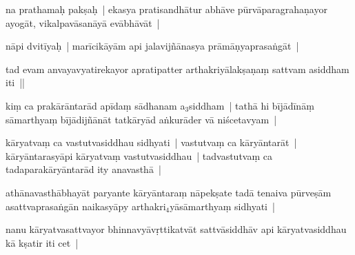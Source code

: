 \documentclass[article,12pt,a4paper]{memoir}%
\newcounter{parCount}
\begin{document}
	  
	  \pstart \leavevmode%
	\label{thakur75-71.7}na prathamaḥ pakṣaḥ | ekasya pratisandhātur abhāve pūrvāparagrahaṇayor ayogāt, vikalpavāsanāyā evābhāvāt |
	{}
	\pend%
      

	  
	  \pstart \leavevmode%
	\label{thakur75-71.9}nāpi dvitīyaḥ | marīcikāyām api jalavijñānasya prāmāṇyaprasaṅgāt |
	{}
	\pend%
      

	  
	  \pstart \leavevmode%
	\label{thakur75-71.9a}tad evam anvayavyatirekayor apratipatter arthakriyālakṣaṇaṃ sattvam asiddham iti ||
	{}
	\pend%
      

	  
	  \pstart \leavevmode%
	\label{thakur75-71.11}kiṃ ca prakārāntarād apīdaṃ sādhanam a{\tiny $_{3}$}siddham | tathā hi bījādīnāṃ sāmarthyaṃ bījādijñānāt tatkāryād aṅkurāder vā niścetavyam |
	{}
	\pend%
      

	  
	  \pstart \leavevmode%
	\label{thakur75-71.12}kāryatvaṃ ca vastutvasiddhau sidhyati | vastutvaṃ ca kāryāntarāt | kāryāntarasyāpi kāryatvaṃ vastutvasiddhau | tadvastutvaṃ ca tadaparakāryāntarād ity anavasthā |
	{}
	\pend%
      

	  
	  \pstart \leavevmode%
	\label{thakur75-71.15}athānavasthābhayāt paryante kāryāntaraṃ nāpekṣate tadā tenaiva pūrveṣām asattvaprasaṅgān naikasyāpy arthakri{\tiny $_{4}$}yāsāmarthyaṃ sidhyati |
	{}
	\pend%
      

	  
	  \pstart \leavevmode%
	\label{thakur75-71.17}nanu kāryatvasattvayor bhinnavyāvṛttikatvāt \label{ratnakīrtinibandhāvali__36r1PF7IMUT19YJQJP8HLZNIM4Y}sattvāsiddhāv\label{ratnakīrtinibandhāvali__36r1PF7IMURRIVO388ZTVNIPXXN} api kāryatvasiddhau kā kṣatir iti cet |
	{}
	\pend%
      
\end{document}

